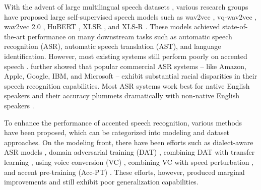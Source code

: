 \documentclass[11pt,a4paper]{article}
\begin{document}
With the advent of large multilingual speech datasets \citep{7178964, indicwav2vec, Chen2021GigaSpeechAE, Ardila2020CommonVA, Valk2021VOXLINGUA107AD}, various research groups have proposed large self-supervised speech models such as wav2vec \cite{schneider19_interspeech}, vq-wav2vec \cite{Baevski2020vqwav2vecSL}, wav2vec 2.0 \cite{Baevski2020wav2vec2A}, HuBERT \cite{9585401}, XLSR \cite{Conneau2021UnsupervisedCR}, and XLS-R \cite{Babu2022XLSRSC}. These models achieved state-of-the-art performance on many downstream tasks such as automatic speech recognition (ASR), automatic speech translation (AST), and language identification. However, most existing systems still perform poorly on accented speech \citep{javed2022towards}. \citet{koenecke2020racial} further showed that popular commercial ASR systems -- like Amazon, Apple, Google, IBM, and Microsoft -- exhibit substantial racial disparities in their speech recognition capabilities. Most ASR systems work best for native English speakers and their accuracy plummets dramatically with non-native English speakers \cite{hassan2022improvement, prasad-jyothi-2020-accents}.


To enhance the performance of accented speech recognition, various methods have been proposed, which can be categorized into modeling and dataset approaches. On the modeling front, there have been efforts such as dialect-aware ASR models \cite{Yadavalli2022MultiTaskEM}, domain adversarial training (DAT) \cite{Sun2018DomainAT}, combining DAT with transfer learning \cite{Chen2020AipnetGA}, using voice conversion (VC) \cite{zhang22n_interspeech}, combining VC with speed perturbation \cite{zhang22n_interspeech}, and accent pre-training (Acc-PT) \cite{Das2021BestOB}. These efforts, however, produced marginal improvements and still exhibit poor generalization capabilities. 
\end{document}
